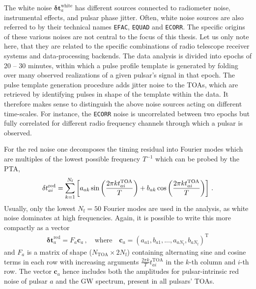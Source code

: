The white noise $\bm{\delta t}_{a}^\text{white}$ has  different sources connected to radiometer noise, instrumental effects, and pulsar phase jitter. Often, white noise sources are also referred to by their technical names \texttt{EFAC}, \texttt{EQUAD} and \texttt{ECORR}. The specific origins of these various noises are not central to the focus of this thesis. Let us only note here, that they are related to the specific combinations of radio telescope receiver systems and data-processing backends. The data analysis is divided into epochs of 20 -- 30 minutes, within which a pulse profile template is generated by folding over many observed realizations of a given pulsar's signal in that epoch. The pulse template generation procedure adds jitter noise to the \acp{TOA}, which are retrieved by identifying pulses in shape of the template within the data. It therefore makes sense to distinguish the above noise sources acting on different time-scales. For instance, the \texttt{ECORR} noise is uncorrelated between two epochs but fully correlated for different radio frequency channels through which a pulsar is observed.

For the red noise one decomposes the timing  residual into Fourier modes which are multiples of the lowest possible frequency $T^{-1}$ which can be probed by the \ac{PTA},
\begin{align}
	\delta t_{ai}^\text{red}  = \sum_{k= 1}^{N_\text{f}} \left[ a_{ak} \sin \left( \frac{2 \pi k t_{ai}^\text{TOA}}{T} \right) + b_{ak} \cos \left( \frac{2 \pi k t_{ai}^\text{TOA}}{T} \right) \right] \, .
\end{align}
Usually, only the lowest $N_\text{f} = 50$ Fourier modes are used in the analysis, as white noise dominates at high frequencies. Again, it is possible to write this more compactly as a vector
\begin{align}
	\bm{\delta t}_{a}^\text{red} = F_a \bm{c}_a \, , \quad \text{where} \quad \bm{c}_a = (a_{a1}, b_{a1}, ..., a_{a N_\text{f}}, b_{a N_\text{f}})^\text{T}
\end{align}
and $F_a$ is a matrix of shape ($N_\text{TOA} \times 2 N_\text{f}$) containing alternating sine and cosine terms in each row with increasing arguments $\frac{2 \pi k}{T}t_{ai}^\text{TOA}$ in the $k$-th column and $i$-th row. The vector $\bm{c}_a$ hence includes both the amplitudes for pulsar-intrinsic red noise of pulsar $a$ and the \ac{GW} spectrum, present in all pulsars' \acp{TOA}.


